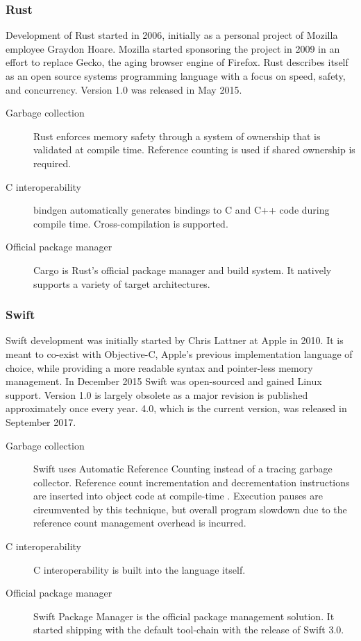 \subsubsection{Rust}
Development of Rust started in 2006, initially as a personal project of Mozilla employee Graydon Hoare. Mozilla started sponsoring the project in 2009 in an effort to replace Gecko, the aging browser engine of Firefox. Rust describes itself as an open source systems programming language with a focus on speed, safety, and concurrency. 
Version 1.0 was released in May 2015.
\begin{description} 
\item [Garbage collection]
Rust enforces memory safety through a system of ownership that is validated at compile time. Reference counting is used if shared ownership is required.
\item [C interoperability]
bindgen \cite{bindgen} automatically generates bindings to C and C++ code during compile time. Cross-compilation is supported.
\item [Official package manager]
Cargo is Rust's official package manager and build system. It natively supports a variety of target architectures.
\end{description}

\subsubsection{Swift}
Swift development was initially started by Chris Lattner at Apple in 2010. It is meant to co-exist with Objective-C, Apple's previous implementation language of choice, while providing a more readable syntax and pointer-less memory management. In December 2015 Swift was open-sourced and gained Linux support. Version 1.0 is largely obsolete as a major revision is published approximately once every year. 
4.0, which is the current version, was released in September 2017. 
\begin{description} 
\item [Garbage collection]
Swift uses Automatic Reference Counting instead of a tracing garbage collector. Reference count incrementation and decrementation instructions are inserted into object code at compile-time \cite{llvm-arc}. Execution pauses are circumvented by this technique, but overall program slowdown due to the reference count management overhead is incurred.
\item [C interoperability]
C interoperability is built into the language itself.
\item [Official package manager]
Swift Package Manager is the official package management solution. It started shipping with the default tool-chain with the release of Swift 3.0.
\end{description}

